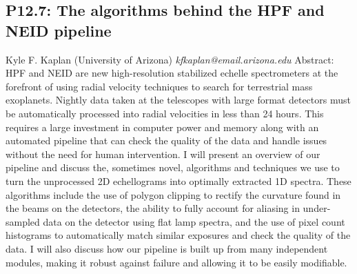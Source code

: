 \documentclass{report}
\begin{document}
\subsection*{P12.7: The algorithms behind the HPF and NEID pipeline}
\bigskip
Kyle F. Kaplan (University of Arizona) \newline   \newline   \newline   \newline  \newline  \newline\newline
{\it kfkaplan@email.arizona.edu}\newline
\newline\newline
Abstract: HPF and NEID are new high-resolution stabilized echelle spectrometers at the forefront of using radial velocity techniques to search for terrestrial mass exoplanets.  Nightly data taken at the telescopes with large format detectors must be automatically processed into radial velocities in less than 24 hours.  This requires a large investment in computer power and memory along with an automated pipeline that can check the quality of the data and handle issues without the need for human intervention.  I will present an overview of our pipeline and discuss the, sometimes novel, algorithms and techniques we use to turn the unprocessed 2D echellograms into optimally extracted 1D spectra.   These algorithms include the use of polygon clipping to rectify the curvature found in the beams on the detectors, the ability to fully account for aliasing in under-sampled data on the detector using flat lamp spectra, and the use of pixel count histograms to automatically match similar exposures and check the quality of the data.  I will also discuss how our pipeline is built up from many independent modules, making it robust against failure and allowing it to be easily modifiable.\newline
\newpage
\end{document}
